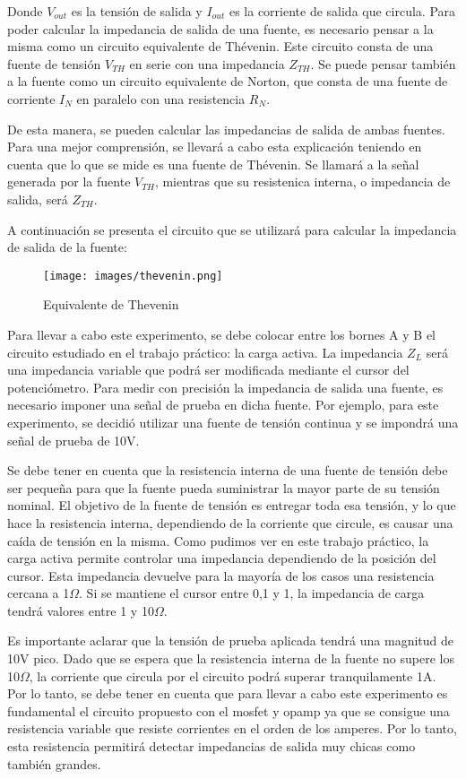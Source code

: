\documentclass[12pt,oneside,a4paper]{article}
\begin{document}
Donde $V_{out}$ es la tensión de salida y $I_{out}$ es la corriente de salida que circula. Para poder calcular
la impedancia de salida de una fuente, es necesario pensar a la misma como un circuito equivalente de
Thévenin. Este circuito consta de una fuente de tensión $V_{TH}$ en serie con una impedancia $Z_{TH}$.
Se puede pensar también a la fuente como un circuito equivalente de Norton, que consta de una fuente de
corriente $I_{N}$ en paralelo con una resistencia $R_{N}$. 

De esta manera, se pueden calcular las impedancias 
de salida de ambas fuentes. Para una mejor comprensión, se llevará a cabo esta explicación teniendo en 
cuenta que lo que se mide es una fuente de Thévenin. Se llamará a la señal generada por la fuente 
$V_{TH}$, mientras que su resistenica interna, o impedancia de salida, será $Z_{TH}$.

A continuación se presenta el circuito que se utilizará para calcular la impedancia de salida de la fuente:

\begin{figure}[H]
    \centering
    \texttt{[image: images/thevenin.png]}
    \caption{Equivalente de Thevenin}
\end{figure}

\newpage
Para llevar a cabo este experimento, se debe colocar entre los bornes A y B el circuito estudiado en 
el trabajo práctico: la carga activa. La impedancia $Z_L$ será una impedancia variable que podrá ser 
modificada mediante el cursor del potenciómetro. Para medir con precisión la impedancia de salida una 
fuente, es necesario imponer una señal de prueba en dicha fuente. Por ejemplo, para este experimento, 
se decidió utilizar una fuente de tensión continua y se impondrá una señal de prueba de 10V.

Se debe tener en cuenta que la resistencia interna de una fuente de tensión debe ser pequeña para que
la fuente pueda suministrar la mayor parte de su tensión nominal. El objetivo de la fuente de tensión 
es entregar toda esa tensión, y lo que hace la resistencia interna, dependiendo de la corriente que 
circule, es causar una caída de tensión en la misma. Como pudimos ver en este trabajo práctico, 
la carga activa permite controlar una impedancia dependiendo de la posición del cursor.
Esta impedancia devuelve para la mayoría de los casos una resistencia cercana a 1$\Omega$. Si se 
mantiene el cursor entre 0,1 y 1, la impedancia de carga tendrá valores entre 1 y 10$\Omega$.

Es importante aclarar que la tensión de prueba aplicada tendrá una magnitud de 10V pico. Dado que se 
espera que la resistencia interna de la fuente no supere los 10$\Omega$, la corriente que 
circula por el circuito podrá superar tranquilamente 1A. Por lo tanto, se debe tener en cuenta
que para llevar a cabo este experimento es fundamental el circuito propuesto con el mosfet y opamp 
ya que se consigue una resistencia variable que resiste corrientes en el orden de los amperes.
Por lo tanto, esta resistencia permitirá detectar impedancias de salida muy chicas como también grandes.
\end{document}
